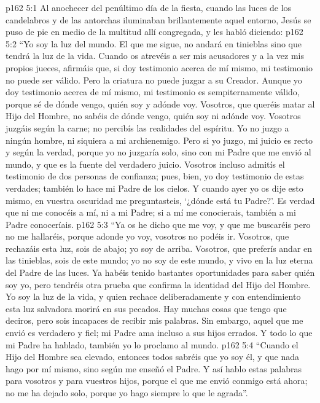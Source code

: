 \vs p162 5:1 Al anochecer del penúltimo día de la fiesta, cuando las luces de los candelabros y de las antorchas iluminaban brillantemente aquel entorno, Jesús se puso de pie en medio de la multitud allí congregada, y les habló diciendo:
\vs p162 5:2 \pc “Yo soy la luz del mundo. El que me sigue, no andará en tinieblas sino que tendrá la luz de la vida. Cuando os atrevéis a ser mis acusadores y a la vez mis propios jueces, afirmáis que, si doy testimonio acerca de mí mismo, mi testimonio no puede ser válido. Pero la criatura no puede juzgar a su Creador. Aunque yo doy testimonio acerca de mí mismo, mi testimonio es sempiternamente válido, porque sé de dónde vengo, quién soy y adónde voy. Vosotros, que queréis matar al Hijo del Hombre, no sabéis de dónde vengo, quién soy ni adónde voy. Vosotros juzgáis según la carne; no percibís las realidades del espíritu. Yo no juzgo a ningún hombre, ni siquiera a mi archienemigo. Pero si yo juzgo, mi juicio es recto y según la verdad, porque yo no juzgaría solo, sino con mi Padre que me envió al mundo, y que es la fuente del verdadero juicio. Vosotros incluso admitís el testimonio de dos personas de confianza; pues, bien, yo doy testimonio de estas verdades; también lo hace mi Padre de los cielos. Y cuando ayer yo os dije esto mismo, en vuestra oscuridad me preguntasteis, ‘¿dónde está tu Padre?’. Es verdad que ni me conocéis a mí, ni a mi Padre; si a mí me conocierais, también a mi Padre conoceríais.
\vs p162 5:3 “Ya os he dicho que me voy, y que me buscaréis pero no me hallaréis, porque adonde yo voy, vosotros no podéis ir. Vosotros, que rechazáis esta luz, sois de abajo; yo soy de arriba. Vosotros, que preferís andar en las tinieblas, sois de este mundo; yo no soy de este mundo, y vivo en la luz eterna del Padre de las luces. Ya habéis tenido bastantes oportunidades para saber quién soy yo, pero tendréis otra prueba que confirma la identidad del Hijo del Hombre. Yo soy la luz de la vida, y quien rechace deliberadamente y con entendimiento esta luz salvadora morirá en sus pecados. Hay muchas cosas que tengo que deciros, pero sois incapaces de recibir mis palabras. Sin embargo, aquel que me envió es verdadero y fiel; mi Padre ama incluso a sus hijos errados. Y todo lo que mi Padre ha hablado, también yo lo proclamo al mundo.
\vs p162 5:4 “Cuando el Hijo del Hombre sea elevado, entonces todos sabréis que yo soy él, y que nada hago por mí mismo, sino según me enseñó el Padre. Y así hablo estas palabras para vosotros y para vuestros hijos, porque el que me envió conmigo está ahora; no me ha dejado solo, porque yo hago siempre lo que le agrada”.
